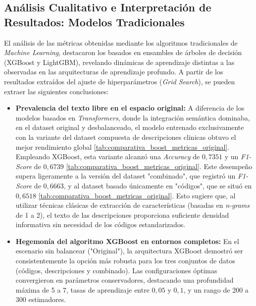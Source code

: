 \documentclass[12pt,a4paper,onecolumn,oneside]{report}
\begin{document}
\subsection{Análisis Cualitativo e Interpretación de Resultados: Modelos Tradicionales}

El análisis de las métricas obtenidas mediante los algoritmos tradicionales de \textit{Machine Learning}, destacaron los basados en ensambles de árboles de decisión (XGBoost y LightGBM), revelando dinámicas de aprendizaje distintas a las observadas en las arquitecturas de aprendizaje profundo. A partir de los resultados extraídos del ajuste de hiperparámetros (\textit{Grid Search}), se pueden extraer las siguientes conclusiones:

\begin{itemize}
    \item \textbf{Prevalencia del texto libre en el espacio original:} A diferencia de los modelos basados en \textit{Transformers}, donde la integración semántica dominaba, en el dataset original y desbalanceado, el modelo entrenado exclusivamente con la variante del dataset compuesta de descripciones clinicas obtuvo el mejor rendimiento global \ref{tab:comparativa_boost_metricas_original}. Empleando XGBoost, esta variante alcanzó una \textit{Accuracy} de $0,7351$ y un \textit{F1-Score} de $0,6739$ \ref{tab:comparativa_boost_metricas_original}. Este desempeño supera ligeramente a la versión del dataset "combinado", que registró un \textit{F1-Score} de $0,6663$, y al dataset basado únicamente en "códigos", que se situó en $0,6518$ \ref{tab:comparativa_boost_metricas_original}. Esto sugiere que, al utilizar técnicas clásicas de extracción de características (basadas en \textit{n-grams} de 1 a 2), el texto de las descripciones proporciona suficiente densidad informativa sin necesidad de los códigos estandarizados.
    
    \item \textbf{Hegemonía del algoritmo XGBoost en entornos completos:} En el escenario sin balancear ("Original"), la arquitectura XGBoost demostró ser consistentemente la opción más robusta para los tres conjuntos de datos (códigos, descripciones y combinado). Las configuraciones óptimas convergieron en parámetros conservadores, destacando una profundidad máxima  de 5 a 7, tasas de aprendizaje entre $0,05$ y $0,1$, y un rango de 200 a 300 estimadores.
    

\end{itemize}
\end{document}
